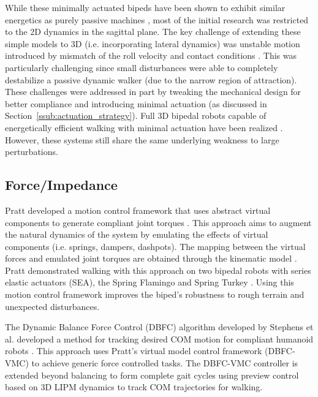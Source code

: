 While these minimally actuated bipeds have been shown to exhibit similar energetics as purely passive machines \cite{Asano:2004jp}, most of the initial research was restricted to the 2D dynamics in the sagittal plane. The key challenge of extending these simple models to 3D (i.e. incorporating lateral dynamics) was unstable motion introduced by mismatch of the roll velocity and contact conditions \cite{Kuo:1999tn}. This was particularly challenging since small disturbances were able to completely destabilize a passive dynamic walker (due to the narrow region of attraction). These challenges were addressed in part by tweaking the mechanical design for better compliance and introducing minimal actuation (as discussed in Section~\ref{ssub:actuation_strategy}). Full 3D bipedal robots capable of energetically efficient walking with minimal actuation have been realized \cite{Collins:2005vp,Anderson:2005cw,Hobbelen2008}. However, these systems still share the same underlying weakness to large perturbations. 


\subsection{Force/Impedance} %
\label{sub:related_force_impedance}
Pratt developed a motion control framework that uses abstract virtual components to generate compliant joint torques \cite{Pratt:1995ww}. This approach aims to augment the natural dynamics of the system by emulating the effects of virtual components (i.e. springs, dampers, dashpots). The mapping between the virtual forces and emulated joint torques are obtained through the kinematic model \cite{Pratt:1998cf}. Pratt demonstrated walking with this approach on two bipedal robots with series elastic actuators (SEA), the Spring Flamingo and Spring Turkey \cite{Pratt:2001vu}. Using this motion control framework improves the biped's robustness to rough terrain and unexpected disturbances.

The Dynamic Balance Force Control (DBFC) algorithm developed by Stephens et al. developed a method for tracking desired COM motion for compliant humanoid robots \cite{Stephens:2010fj}. This approach uses Pratt's virtual model control framework (DBFC-VMC) to achieve generic force controlled tasks. The DBFC-VMC controller is extended beyond balancing to form complete gait cycles using preview control \cite{KajitaEtAlICRA2003} based on 3D LIPM dynamics to track COM trajectories for walking. 

